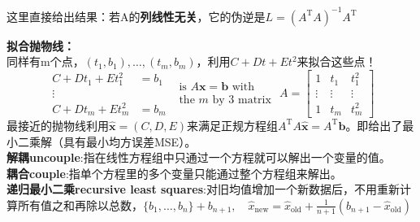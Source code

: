     这里直接给出结果：若A的\textbf{列线性无关}，它的伪逆是$L=\left(A^{\mathrm{T}} A\right)^{-1} A^{\mathrm{T}}$

    \textbf{拟合抛物线：}\\
    同样有m个点，$(t_{1},b_{1}), \dots, (t_{m},b_{m})$，利用$C+D t+E t^{2}$来拟合这些点！\\
    $$
    \begin{aligned} C+D t_{1}+E t_{1}^{2} &=b_{1} \\ \vdots & \\ C+D t_{m}+E t_{m}^{2} &=b_{m} \end{aligned}
    \begin{array}{l}{\text { is } A \boldsymbol{x}=\boldsymbol{b} \text { with }} \\ {\text { the } m \text { by } 3 \text { matrix }}\end{array}
    A=\left[\begin{array}{ccc}{1} & {t_{1}} & {t_{1}^{2}} \\ {\vdots} & {\vdots} & {\vdots} \\ {1} & {t_{m}} & {t_{m}^{2}}\end{array}\right]
    $$
    最接近的抛物线利用$\widehat{\boldsymbol{x}}=(C, D, E)$来满足正规方程组$A^{\mathrm{T}} A \widehat{\boldsymbol{x}}=A^{\mathrm{T}} \boldsymbol{b}$。即给出了最小二乘解（具有最小均方误差MSE）。
    \\
    \textbf{解耦uncouple}:指在线性方程组中只通过一个方程就可以解出一个变量的值。\\
    \textbf{耦合couple}:指单个方程里的多个变量只能通过整个方程组来解出。
    \\
    \textbf{递归最小二乘recursive least squares}:对旧均值增加一个新数据后，不用重新计算所有值之和再除以总数，$\{b_1,\dots, b_n\}+ b_{n+1},\quad \widehat{x}_{\mathrm{new}}=\widehat{x}_{\mathrm{old}}+\frac{1}{n+1}\left(b_{n+1}-\widehat{x}_{\mathrm{old}}\right)$
    \\
